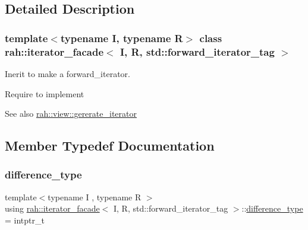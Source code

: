\subsection{Detailed Description}
\subsubsection*{template$<$typename I, typename R$>$\newline
class rah\+::iterator\+\_\+facade$<$ I, R, std\+::forward\+\_\+iterator\+\_\+tag $>$}

Inerit to make a forward\+\_\+iterator. 

Require to implement 
\begin{DoxyCode}{0}
\end{DoxyCode}
 \begin{DoxySeeAlso}{See also}
\mbox{\hyperlink{structrah_1_1view_1_1gererate__iterator}{rah\+::view\+::gererate\+\_\+iterator}} 
\end{DoxySeeAlso}


\subsection{Member Typedef Documentation}
\mbox{\label{structrah_1_1iterator__facade_3_01_i_00_01_r_00_01std_1_1forward__iterator__tag_01_4_a9f8ec957ea36b46eae3ca8bb89b6cf1c}} 
\subsubsection{\texorpdfstring{difference\_type}{difference\_type}}
{\footnotesize\ttfamily template$<$typename I , typename R $>$ \\
using \mbox{\hyperlink{structrah_1_1iterator__facade}{rah\+::iterator\+\_\+facade}}$<$ I, R, std\+::forward\+\_\+iterator\+\_\+tag $>$\+::\mbox{\hyperlink{structrah_1_1iterator__facade_3_01_i_00_01_r_00_01std_1_1forward__iterator__tag_01_4_a9f8ec957ea36b46eae3ca8bb89b6cf1c}{difference\+\_\+type}} =  intptr\+\_\+t}

